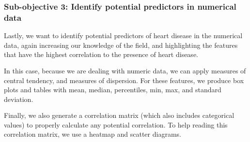 \subsubsection{Sub-objective 3: Identify potential predictors in numerical data}

Lastly, we want to identify potential predictors of heart disease in the numerical data, again increasing our
knowledge of the field, and highlighting the features that have the highest correlation to the presence of
heart disease.

In this case, because we are dealing with numeric data, we can apply measures of central tendency, and measures
of dispersion. For these features, we produce box plots and tables with mean, median, percentiles, min, max, and
standard deviation.

Finally, we also generate a correlation matrix (which also includes categorical values) to properly calculate
any potential correlation. To help reading this correlation matrix, we use a heatmap and scatter diagrams.

